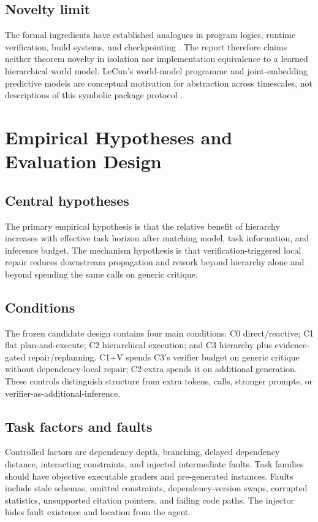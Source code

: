 \documentclass[11pt]{article}
\begin{document}
\subsection{Novelty limit}
The formal ingredients have established analogues in program logics, runtime verification, build systems, and checkpointing \citep{hoare1969axiomatic,leucker2009runtime,mokhov2018build,daly2006higher}. The report therefore claims neither theorem novelty in isolation nor implementation equivalence to a learned hierarchical world model. LeCun's world-model programme and joint-embedding predictive models are conceptual motivation for abstraction across timescales, not descriptions of this symbolic package protocol \citep{lecun2022path,bardes2024vjepa}.

\section{Empirical Hypotheses and Evaluation Design}
\subsection{Central hypotheses}
The primary empirical hypothesis is that the relative benefit of hierarchy increases with effective task horizon after matching model, task information, and inference budget. The mechanism hypothesis is that verification-triggered local repair reduces downstream propagation and rework beyond hierarchy alone and beyond spending the same calls on generic critique.

\subsection{Conditions}
The frozen candidate design contains four main conditions: C0 direct/reactive; C1 flat plan-and-execute; C2 hierarchical execution; and C3 hierarchy plus evidence-gated repair/replanning. C1+V spends C3's verifier budget on generic critique without dependency-local repair; C2-extra spends it on additional generation. These controls distinguish structure from extra tokens, calls, stronger prompts, or verifier-as-additional-inference.

\subsection{Task factors and faults}
Controlled factors are dependency depth, branching, delayed dependency distance, interacting constraints, and injected intermediate faults. Task families should have objective executable graders and pre-generated instances. Faults include stale schemas, omitted constraints, dependency-version swaps, corrupted statistics, unsupported citation pointers, and failing code paths. The injector hides fault existence and location from the agent.
\end{document}
